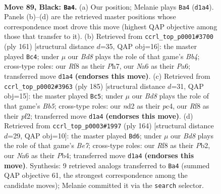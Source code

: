 \documentclass[11pt]{article}
\begin{document}
\clearpage

\begin{figure}[p]\centering
\begin{subfigure}{0.46\textwidth}\centering
\resizebox{\linewidth}{!}{%
\newchessgame
\chessboard[
  setfen={5r2/3k1p2/n5p1/4P2p/5Pp1/8/3N1K1P/1B1b4 b - - 37 89},
  showmover=false,
  pgfstyle=straightmove, color=movearrow, markmove={d1-a4}
]}
\caption{}
\end{subfigure}\hfill
\begin{subfigure}{0.46\textwidth}\centering
\resizebox{\linewidth}{!}{%
\newchessgame
\chessboard[
  setfen={8/7p/p5p1/Pb1nkp2/7P/B5P1/2BK1P2/8 b - - 12 81},
  showmover=false,
  pgfstyle=straightmove, color=movearrow, markmove={b5-c4}
]}
\caption{}
\end{subfigure}
\\[4pt]
\begin{subfigure}{0.46\textwidth}\centering
\resizebox{\linewidth}{!}{%
\newchessgame
\chessboard[
  setfen={2B5/8/5k2/p4p2/PbP1p1p1/4P1P1/5P2/3K4 b - - 57 93},
  showmover=false,
  pgfstyle=straightmove, color=movearrow, markmove={b4-c5}
]}
\caption{}
\end{subfigure}\hfill
\begin{subfigure}{0.46\textwidth}\centering
\resizebox{\linewidth}{!}{%
\newchessgame
\chessboard[
  setfen={8/4B3/8/1p1b3k/1P3p1p/5P1P/1P4P1/6K1 w - - 36 83},
  showmover=false,
  pgfstyle=straightmove, color=movearrow, markmove={e7-d6}
]}
\caption{}
\end{subfigure}
\caption{\textbf{Move 89, Black: \texttt{Ba4}.} (a) Our position; Melanie plays \texttt{Ba4} (\texttt{d1a4}). Panels (b)--(d) are the retrieved master positions whose correspondence most drove this move (highest QAP objective among those that transfer to it). (b) Retrieved from \texttt{ccrl\_top\_p0001\#3700} (ply 161) [structural distance $d$=35, QAP obj=16]: the master played \texttt{Bc4}; under $\mu$ our \emph{Bd8} plays the role of that game's \emph{Bb4}; cross-type roles: our \emph{R}f8 as their \emph{P}h7, our \emph{N}a6 as their \emph{P}a6; transferred move \texttt{d1a4} \textbf{(endorses this move)}. (c) Retrieved from \texttt{ccrl\_top\_p0002\#3963} (ply 185) [structural distance $d$=31, QAP obj=15]: the master played \texttt{Bc5}; under $\mu$ our \emph{Bd8} plays the role of that game's \emph{Bb5}; cross-type roles: our \emph{n}d2 as their \emph{p}c4, our \emph{R}f8 as their \emph{p}f2; transferred move \texttt{d1a4} \textbf{(endorses this move)}. (d) Retrieved from \texttt{ccrl\_top\_p0003\#1997} (ply 164) [structural distance $d$=29, QAP obj=10]: the master played \texttt{Bd6}; under $\mu$ our \emph{Bd8} plays the role of that game's \emph{Be7}; cross-type roles: our \emph{R}f8 as their \emph{P}b2, our \emph{N}a6 as their \emph{P}b4; transferred move \texttt{d1a4} \textbf{(endorses this move)}. Synthesis: 9 retrieved analogs transferred to \texttt{Ba4} (summed QAP objective 61, the strongest correspondence among the candidate moves); Melanie committed it via the \texttt{search} selector.}
\label{fig:thought-m177}
\end{figure}
\end{document}
